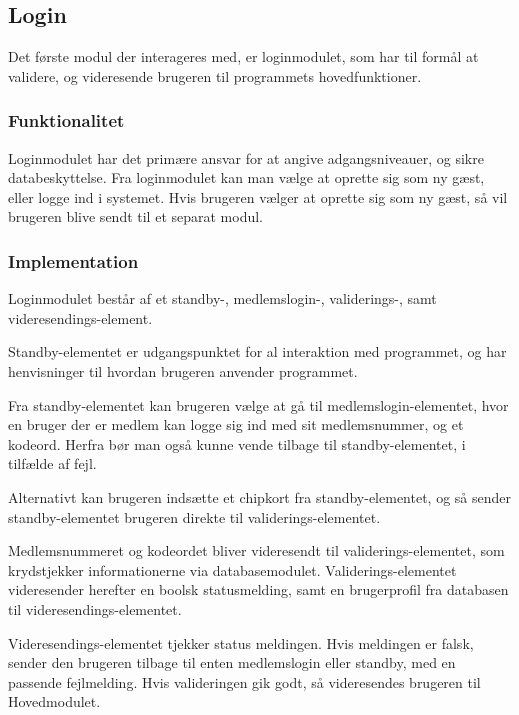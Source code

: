 \subsection{Login}
\label{sub:login}

Det første modul der interageres med, er loginmodulet, som har til formål at validere, og videresende brugeren til programmets hovedfunktioner.

\subsubsection{Funktionalitet}
\label{ssub:login_funktionalitet}

Loginmodulet har det primære ansvar for at angive adgangsniveauer, og sikre databeskyttelse. Fra loginmodulet kan man vælge at oprette sig som ny gæst, eller logge ind i systemet. Hvis brugeren vælger at oprette sig som ny gæst, så vil brugeren blive sendt til et separat modul.

\subsubsection{Implementation}
\label{ssub:login_implementation}


Loginmodulet består af et standby-, medlemslogin-, validerings-, samt videresendings-element.

Standby-elementet er udgangspunktet for al interaktion med programmet, og har henvisninger til hvordan brugeren anvender programmet. 

Fra standby-elementet kan brugeren vælge at gå til medlemslogin-elementet, hvor en bruger der er medlem kan logge sig ind med sit medlemsnummer, og et kodeord. Herfra bør man også kunne vende tilbage til standby-elementet, i tilfælde af fejl.

Alternativt kan brugeren indsætte et chipkort fra standby-elementet, og så sender standby-elementet brugeren direkte til validerings-elementet.

Medlemsnummeret og kodeordet bliver videresendt til validerings-elementet, som krydstjekker informationerne via databasemodulet. Validerings-elementet videresender herefter en boolsk statusmelding, samt en brugerprofil fra databasen til videresendings-elementet.

Videresendings-elementet tjekker status meldingen. Hvis meldingen er falsk, sender den brugeren tilbage til enten medlemslogin eller standby, med en passende fejlmelding. Hvis valideringen gik godt, så videresendes brugeren til Hovedmodulet.
